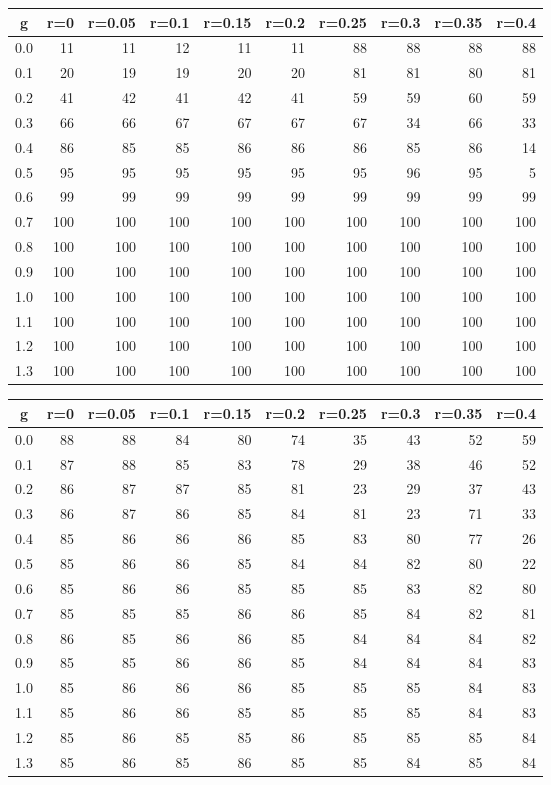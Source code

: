 %
\begin{table}[!tbp]
 \begin{center}
 \begin{tabular}{rrrrrrrrrr}\hline\hline
\multicolumn{1}{c}{g}&\multicolumn{1}{c}{r=0}&\multicolumn{1}{c}{r=0.05}&\multicolumn{1}{c}{r=0.1}&\multicolumn{1}{c}{r=0.15}&\multicolumn{1}{c}{r=0.2}&\multicolumn{1}{c}{r=0.25}&\multicolumn{1}{c}{r=0.3}&\multicolumn{1}{c}{r=0.35}&\multicolumn{1}{c}{r=0.4}\tabularnewline
\hline
0.0& 11& 11& 12& 11& 11& 88& 88& 88& 88\tabularnewline
0.1& 20& 19& 19& 20& 20& 81& 81& 80& 81\tabularnewline
0.2& 41& 42& 41& 42& 41& 59& 59& 60& 59\tabularnewline
0.3& 66& 66& 67& 67& 67& 67& 34& 66& 33\tabularnewline
0.4& 86& 85& 85& 86& 86& 86& 85& 86& 14\tabularnewline
0.5& 95& 95& 95& 95& 95& 95& 96& 95&  5\tabularnewline
0.6& 99& 99& 99& 99& 99& 99& 99& 99& 99\tabularnewline
0.7&100&100&100&100&100&100&100&100&100\tabularnewline
0.8&100&100&100&100&100&100&100&100&100\tabularnewline
0.9&100&100&100&100&100&100&100&100&100\tabularnewline
1.0&100&100&100&100&100&100&100&100&100\tabularnewline
1.1&100&100&100&100&100&100&100&100&100\tabularnewline
1.2&100&100&100&100&100&100&100&100&100\tabularnewline
1.3&100&100&100&100&100&100&100&100&100\tabularnewline
\hline
\end{tabular}

\end{center}

\end{table}

%
\begin{table}[!tbp]
 \begin{center}
 \begin{tabular}{rrrrrrrrrr}\hline\hline
\multicolumn{1}{c}{g}&\multicolumn{1}{c}{r=0}&\multicolumn{1}{c}{r=0.05}&\multicolumn{1}{c}{r=0.1}&\multicolumn{1}{c}{r=0.15}&\multicolumn{1}{c}{r=0.2}&\multicolumn{1}{c}{r=0.25}&\multicolumn{1}{c}{r=0.3}&\multicolumn{1}{c}{r=0.35}&\multicolumn{1}{c}{r=0.4}\tabularnewline
\hline
0.0&88&88&84&80&74&35&43&52&59\tabularnewline
0.1&87&88&85&83&78&29&38&46&52\tabularnewline
0.2&86&87&87&85&81&23&29&37&43\tabularnewline
0.3&86&87&86&85&84&81&23&71&33\tabularnewline
0.4&85&86&86&86&85&83&80&77&26\tabularnewline
0.5&85&86&86&85&84&84&82&80&22\tabularnewline
0.6&85&86&86&85&85&85&83&82&80\tabularnewline
0.7&85&85&85&86&86&85&84&82&81\tabularnewline
0.8&86&85&86&86&85&84&84&84&82\tabularnewline
0.9&85&85&86&86&85&84&84&84&83\tabularnewline
1.0&85&86&86&86&85&85&85&84&83\tabularnewline
1.1&85&86&86&85&85&85&85&84&83\tabularnewline
1.2&85&86&85&85&86&85&85&85&84\tabularnewline
1.3&85&86&85&86&85&85&84&85&84\tabularnewline
\hline
\end{tabular}

\end{center}

\end{table}


